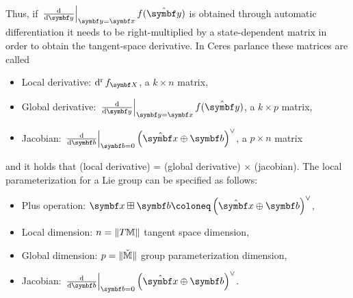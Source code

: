 Thus, if $\left. \frac{\mathrm{d}}{\mathrm{d} \y} \right|_{\y = \x} f(\hat \y)$ is obtained through automatic differentiation it needs to be right-multiplied by a state-dependent matrix in order to obtain the tangent-space derivative. In Ceres parlance these matrices are called
\begin{itemize}
  \item Local derivative: $\dr f_\X$, a $k \times n$ matrix,
  \item Global derivative: $\left. \frac{\mathrm{d}}{\mathrm{d} \y} \right|_{\y = \x} f(\hat \y)$, a $k \times p$ matrix,
  \item Jacobian: $\left. \frac{\mathrm{d}}{\mathrm{d} \b} \right|_{\b = 0} \left( \hat \x \oplus \b\right)^\vee$, a $p \times n$ matrix
\end{itemize}
and it holds that (local derivative) = (global derivative) $\times$ (jacobian). The local parameterization for a Lie group can be specified as follows:
\begin{itemize}
  \item Plus operation: $\x \boxplus \b \coloneq \left( \hat \x \oplus \b \right)^\vee$,
  \item Local dimension: $n = \| T {\mathbb{M}} \|$ tangent space dimension,
  \item Global dimension: $p = \| \check{\mathbb{M}} \|$ group parameterization dimension,
  \item Jacobian: $\left. \frac{\mathrm{d}}{\mathrm{d} \b} \right|_{\b = 0} \left( \hat \x \oplus \b\right)^\vee$.
\end{itemize}

